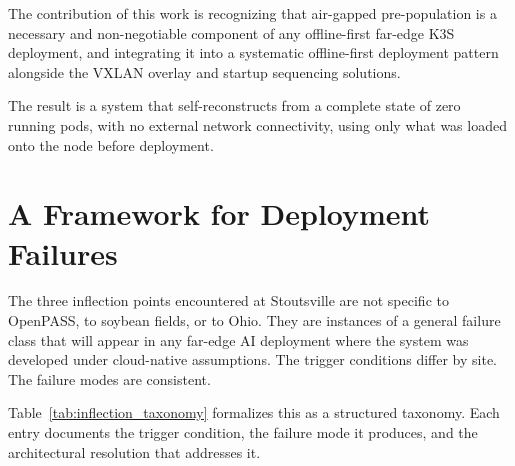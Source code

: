 The contribution of this work is recognizing that air-gapped pre-population is a necessary and non-negotiable component of any offline-first far-edge K3S deployment, and integrating it into a systematic offline-first deployment pattern alongside the VXLAN overlay and startup sequencing solutions.

The result is a system that self-reconstructs from a complete state of zero running pods, with no external network connectivity, using only what was loaded onto the node before deployment.

\section{A Framework for Deployment Failures}
\label{sec:ch3_framework}
The three inflection points encountered at Stoutsville are not specific to OpenPASS, to soybean fields, or to Ohio. They are instances of a general failure class that will appear in any far-edge AI deployment where the system was developed under cloud-native assumptions. The trigger conditions differ by site. The failure modes are consistent.

Table~\ref{tab:inflection_taxonomy} formalizes this as a structured taxonomy. Each entry documents the trigger condition, the failure mode it produces, and the architectural resolution that addresses it.

